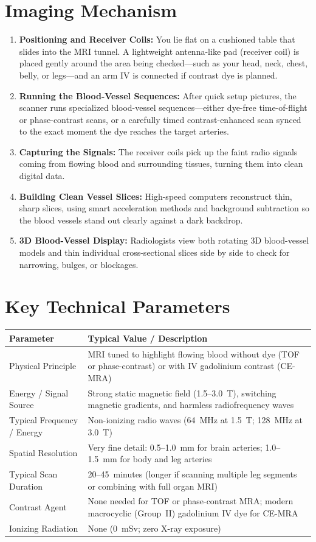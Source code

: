 \section{Imaging Mechanism}
\begin{enumerate}
\item \textbf{Positioning and Receiver Coils:} You lie flat on a cushioned table that slides into the MRI tunnel. A lightweight antenna-like pad (receiver coil) is placed gently around the area being checked---such as your head, neck, chest, belly, or legs---and an arm IV is connected if contrast dye is planned.
\item \textbf{Running the Blood-Vessel Sequences:} After quick setup pictures, the scanner runs specialized blood-vessel sequences---either dye-free time-of-flight or phase-contrast scans, or a carefully timed contrast-enhanced scan synced to the exact moment the dye reaches the target arteries.
\item \textbf{Capturing the Signals:} The receiver coils pick up the faint radio signals coming from flowing blood and surrounding tissues, turning them into clean digital data.
\item \textbf{Building Clean Vessel Slices:} High-speed computers reconstruct thin, sharp slices, using smart acceleration methods and background subtraction so the blood vessels stand out clearly against a dark backdrop.
\item \textbf{3D Blood-Vessel Display:} Radiologists view both rotating 3D blood-vessel models and thin individual cross-sectional slices side by side to check for narrowing, bulges, or blockages.
\end{enumerate}

\section{Key Technical Parameters}
\noindent
\begin{tabularx}{\textwidth}{@{}l X@{}}
\toprule
\textbf{Parameter} & \textbf{Typical Value / Description} \\
\midrule
Physical Principle & MRI tuned to highlight flowing blood without dye (TOF or phase-contrast) or with IV gadolinium contrast (CE-MRA) \\
Energy / Signal Source & Strong static magnetic field (1.5--3.0~T), switching magnetic gradients, and harmless radiofrequency waves \\
Typical Frequency / Energy & Non-ionizing radio waves (64~MHz at 1.5~T; 128~MHz at 3.0~T) \\
Spatial Resolution & Very fine detail: 0.5--1.0~mm for brain arteries; 1.0--1.5~mm for body and leg arteries \\
Typical Scan Duration & 20--45~minutes (longer if scanning multiple leg segments or combining with full organ MRI) \\
Contrast Agent & None needed for TOF or phase-contrast MRA; modern macrocyclic (Group~II) gadolinium IV dye for CE-MRA \\
Ionizing Radiation & None (0~mSv; zero X-ray exposure) \\
\bottomrule
\end{tabularx}

